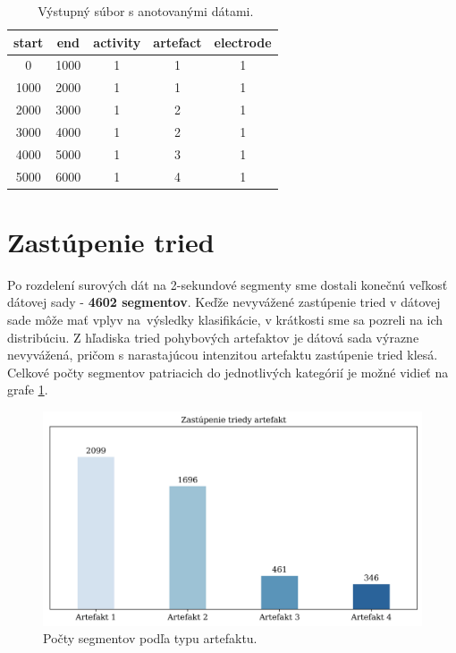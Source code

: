 \begin{table}[H]\centering
\caption[Výstupný súbor s anotovanými dátami.]{~Výstupný súbor s anotovanými dátami.}\label{tab:output}
    \begin{tabular}{c|c|c|c|c}
    	\textbf{start} & \textbf{end} & \textbf{activity} & \textbf{artefact} & \textbf{electrode} \tabularnewline \hline 
     	0		       & 1000		  & 1	              & 1	              & 1	               \tabularnewline \hline
     	1000	       & 2000	      & 1	              & 1	              & 1	               \tabularnewline \hline
        2000	       & 3000	      & 1	              & 2	              & 1	               \tabularnewline \hline
        3000	       & 4000	      & 1	              & 2	              & 1	               \tabularnewline \hline
        4000	       & 5000	      & 1	              & 3	              & 1	               \tabularnewline \hline
        5000	       & 6000	      & 1	              & 4	              & 1	               \tabularnewline
    \end{tabular}
\end{table}


\section{Zastúpenie tried}

Po rozdelení surových dát na 2-sekundové segmenty sme dostali konečnú veľkosť dátovej sady - \textbf{4602 segmentov}. Keďže nevyvážené zastúpenie tried v dátovej sade môže mať vplyv na~výsledky klasifikácie, v krátkosti sme sa pozreli na ich distribúciu. Z hľadiska tried pohybových artefaktov je dátová sada výrazne nevyvážená, pričom s narastajúcou intenzitou artefaktu zastúpenie tried klesá. Celkové počty segmentov patriacich do jednotlivých kategórií je možné vidieť na grafe \ref{fig:artefact_stats}. 

\begin{figure}[H]
    \centering    
    \includegraphics[scale=0.07]{img/artefact_stats.jpg}
    \caption{Počty segmentov podľa typu artefaktu.}
    \label{fig:artefact_stats}
\end{figure}

